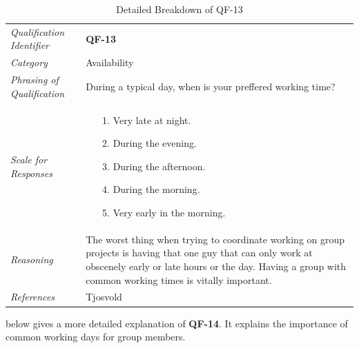 \documentclass[12pt,letterpaper]{article}
\begin{document}
\begin{table}[H]
	\caption{Detailed Breakdown of QF-13}
	\begin{tabu} to 
		\toprule
		Qualification Identifier & {\bf QF-13}\\
		Category & Availability \\
		Phrasing of Qualification & During a typical day, when is your preffered working time? \\
		Scale for Responses &
		\begin{minipage}[t]{\linewidth}
			\begin{enumerate}
				\item[1.] Very late at night.
				\item[2.] During the evening.
				\item[3.] During the afternoon.
				\item[4.] During the morning.
				\item[5.] Very early in the morning.
			\end{enumerate}
		\end{minipage}\\
		Reasoning & The worst thing when trying to coordinate working on group projects is having that one guy that can only work at obscenely early or late hours or the day. Having a group with common working times is vitally important.\\
		References & Tjosvold\cite{tjosvold}\\
		\toprule
	\end{tabu}
\end{table}

 below gives a more detailed explanation of {\bf QF-14}. It explains the importance of common working days for group members.
\end{document}

